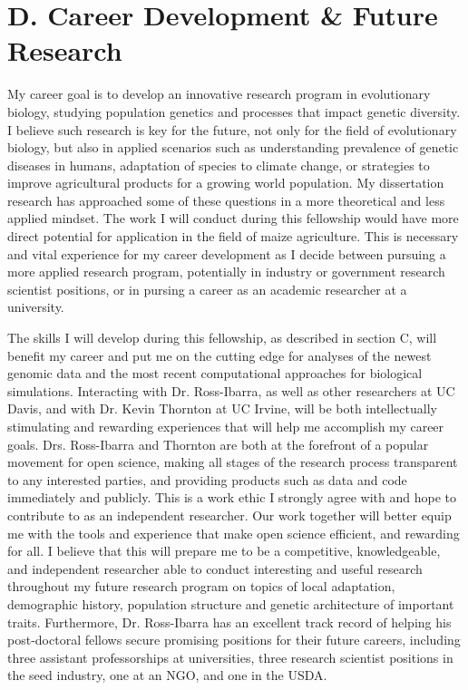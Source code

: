 \section*{D. Career Development \& Future Research}\vspace{-1ex}
My career goal is to develop an innovative research program in evolutionary biology, studying population genetics and processes that impact genetic diversity. I believe such research is key for the future, not only for the field of evolutionary biology, but also in applied scenarios such as understanding prevalence of genetic diseases in humans, adaptation of species to climate change, or strategies to improve agricultural products for a growing world population. My dissertation research has approached some of these questions in a more theoretical and less applied mindset. The work I will conduct during this fellowship would have more direct potential for application in the field of maize agriculture. This is necessary and vital experience for my career development as I decide between pursuing a more applied research program, potentially in industry or government research scientist positions, or in pursing a career as an academic researcher at a university.

The skills I will develop during this fellowship, as described in section C, will benefit my career and put me on the cutting edge for analyses of the newest genomic data and the most recent computational approaches for biological simulations. Interacting with Dr. Ross\--Ibarra, as well as other researchers at UC Davis, and with Dr. Kevin Thornton at UC Irvine, will be both intellectually stimulating and rewarding experiences that will help me accomplish my career goals. Drs. Ross\--Ibarra and Thornton are both at the forefront of a popular movement for open science, making all stages of the research process transparent to any interested parties, and providing products such as data and code immediately and publicly. This is a work ethic I strongly agree with and hope to contribute to as an independent researcher. Our work together will better equip me with the tools and experience that make open science efficient, and rewarding for all. I believe that this will prepare me to be a competitive, knowledgeable, and independent researcher able to conduct interesting and useful research throughout my future research program on topics of local adaptation, demographic history, population structure and genetic architecture of important traits. Furthermore, Dr. Ross-Ibarra has an excellent track record of helping his post-doctoral fellows secure promising positions for their future careers, including three assistant professorships at universities, three research scientist positions in the seed industry, one at an NGO, and one in the USDA.\vspace{-3ex}

